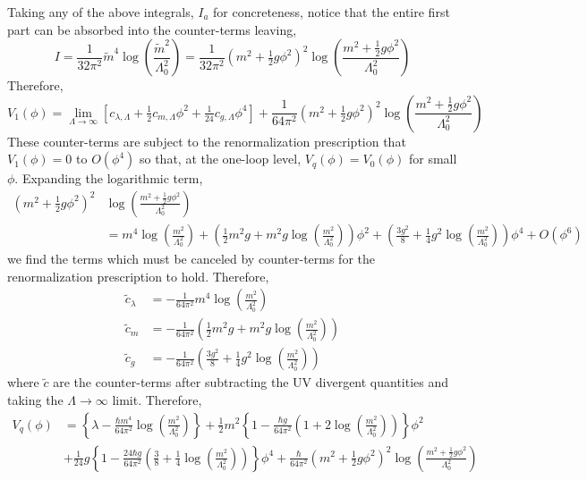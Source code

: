 \documentclass[12pt]{article}
\begin{document}
Taking any of the above integrals, $I_a$ for concreteness, notice that the entire first part can be absorbed into the counter-terms leaving,
\[ I = \frac{1}{32 \pi^2} \tilde{m}^4 \log{\left( \frac{\tilde{m}^2}{\Lambda_0^2}  \right)} = \frac{1}{32 \pi^2} \left(m^2 + \tfrac{1}{2} g \phi^2 \right)^2 \log{\left( \frac{m^2 + \tfrac{1}{2} g \phi^2 }{\Lambda_0^2}  \right)} \]
Therefore,
\[ V_1(\phi) = \lim_{\Lambda \to \infty} \left[ c_{\lambda, \Lambda} + \tfrac{1}{2} c_{m,\Lambda} \phi^2 + \tfrac{1}{24} c_{g, \Lambda} \phi^4   \right] + \frac{1}{64 \pi^2} \left(m^2 + \tfrac{1}{2} g \phi^2 \right)^2 \log{\left( \frac{m^2 + \tfrac{1}{2} g \phi^2 }{\Lambda_0^2}  \right)} \]
These counter-terms are subject to the renormalization prescription that $V_1(\phi) = 0$ to $O(\phi^4)$ so that, at the one-loop level, $V_q(\phi) = V_0(\phi)$ for small $\phi$. 
Expanding the logarithmic term,
\begin{align*}
\left(m^2 + \tfrac{1}{2}  g \phi^2 \right)^2 & \log{\left( \frac{m^2 + \tfrac{1}{2} g \phi^2 }{\Lambda_0^2}  \right)} 
\\
& = m^4 \log{\left( \frac{m^2}{\Lambda_0^2} \right)} + \left( \frac{1}{2} m^2g +  m^2g \log{\left( \frac{m^2}{\Lambda_0^2} \right)} \right) \phi^2 + \left( \frac{3 g^2}{8} + \frac{1}{4} g^2 \log{\left( \frac{m^2}{\Lambda_0^2} \right)} \right) \phi^4 + O(\phi^6)  
\end{align*}
we find the terms which must be canceled by counter-terms for the renormalization prescription to hold. Therefore,
\begin{align*}
\tilde{c}_\lambda & = - \frac{1}{64 \pi^2} m^4 \log{\left( \frac{m^2}{\Lambda_0^2} \right)}
\\
\tilde{c}_{m} & = - \frac{1}{64 \pi^2} \left( \frac{1}{2} m^2g +  m^2g \log{\left( \frac{m^2}{\Lambda_0^2} \right)} \right)
\\
\tilde{c}_g & = - \frac{1}{64 \pi^2} \left( \frac{3 g^2}{8} + \frac{1}{4} g^2 \log{\left( \frac{m^2}{\Lambda_0^2} \right)} \right)
\end{align*}
where $\tilde{c}$ are the counter-terms after subtracting the UV divergent quantities and taking the $\Lambda \to \infty$ limit. Therefore,
\begin{align*}
V_q(\phi) & = \left\{ \lambda - \frac{\hbar m^4}{64 \pi^2} \log{\left( \frac{m^2}{\Lambda_0^2} \right)} \right\} + \frac{1}{2} m^2 \left\{ 1 - \frac{\hbar g}{64 \pi^2} \left(1 +  2 \log{\left( \frac{m^2}{\Lambda_0^2} \right)} \right) \right\} \phi^2 
\\
& + \frac{1}{24} g \left\{ 1 - \frac{24 \hbar g}{64 \pi^2} \left( \frac{3}{8}  + \frac{1}{4} \log{\left( \frac{m^2}{\Lambda_0^2} \right)} \right) \right\} \phi^4 + \frac{\hbar}{64 \pi^2} \left(m^2 + \tfrac{1}{2}  g \phi^2 \right)^2 \log{\left( \frac{m^2 + \tfrac{1}{2} g \phi^2 }{\Lambda_0^2}  \right)} 
\end{align*}
\end{document}
